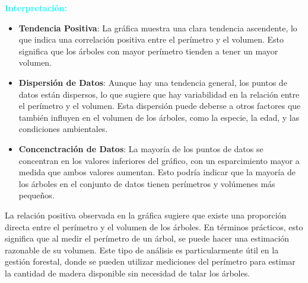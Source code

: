 \documentclass{article}
\begin{document}
\newpage
\large\textbf{\textcolor{cyan}{Interpretación:}}
\begin{itemize}
    \item \textbf{Tendencia Positiva}: La gráfica muestra una clara tendencia ascendente, lo que indica una correlación positiva entre el perímetro y el volumen. Esto significa que los árboles con mayor perímetro tienden a tener un mayor volumen.
    \item \textbf{Dispersión de Datos}: Aunque hay una tendencia general, los puntos de datos están dispersos, lo que sugiere que hay variabilidad en la relación entre el perímetro y el volumen. Esta dispersión puede deberse a otros factores que también influyen en el volumen de los árboles, como la especie, la edad, y las condiciones ambientales.
    \item \textbf{Concenctración de Datos}:  La mayoría de los puntos de datos se concentran en los valores inferiores del gráfico, con un esparcimiento mayor a medida que ambos valores aumentan. Esto podría indicar que la mayoría de los árboles en el conjunto de datos tienen perímetros y volúmenes más pequeños.
    \end{itemize}
La relación positiva observada en la gráfica sugiere que existe una proporción directa entre el perímetro y el volumen de los árboles. En términos prácticos, esto significa que al medir el perímetro de un árbol, se puede hacer una estimación razonable de su volumen. Este tipo de análisis es particularmente útil en la gestión forestal, donde se pueden utilizar mediciones del perímetro para estimar la cantidad de madera disponible sin necesidad de talar los árboles.
\end{document}
